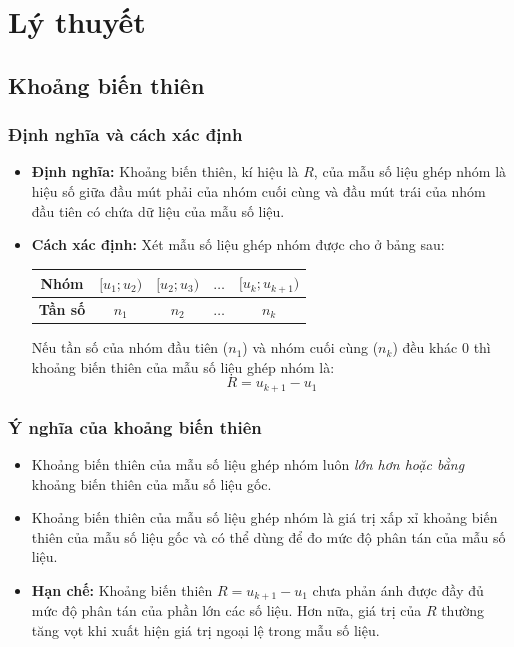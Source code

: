 \documentclass[12pt]{article}
\begin{document}
	\section{Lý thuyết}
	
	\subsection{Khoảng biến thiên}
	
	\subsubsection{Định nghĩa và cách xác định}
	\begin{itemize}
		\item \textbf{Định nghĩa:} Khoảng biến thiên, kí hiệu là $R$, của mẫu số liệu ghép nhóm là hiệu số giữa đầu mút phải của nhóm cuối cùng và đầu mút trái của nhóm đầu tiên có chứa dữ liệu của mẫu số liệu.
		\item \textbf{Cách xác định:} Xét mẫu số liệu ghép nhóm được cho ở bảng sau:
		
		\begin{center}
			\renewcommand{\arraystretch}{1.3}
			\begin{tabular}{|c|c|c|c|c|}
				\hline
				\textbf{Nhóm} & $[u_1; u_2)$ & $[u_2; u_3)$ & $\dots$ & $[u_k; u_{k+1})$ \\
				\hline
				\textbf{Tần số} & $n_1$ & $n_2$ & $\dots$ & $n_k$ \\
				\hline
			\end{tabular}
		\end{center}
		
		Nếu tần số của nhóm đầu tiên ($n_1$) và nhóm cuối cùng ($n_k$) đều khác 0 thì khoảng biến thiên của mẫu số liệu ghép nhóm là:
		\[ R = u_{k+1} - u_1 \]
	\end{itemize}
	
	\subsubsection{Ý nghĩa của khoảng biến thiên}
	\begin{itemize}
		\item Khoảng biến thiên của mẫu số liệu ghép nhóm luôn \textit{lớn hơn hoặc bằng} khoảng biến thiên của mẫu số liệu gốc.
		\item Khoảng biến thiên của mẫu số liệu ghép nhóm là giá trị xấp xỉ khoảng biến thiên của mẫu số liệu gốc và có thể dùng để đo mức độ phân tán của mẫu số liệu.
		\item \textbf{Hạn chế:} Khoảng biến thiên $R = u_{k+1} - u_1$ chưa phản ánh được đầy đủ mức độ phân tán của phần lớn các số liệu. Hơn nữa, giá trị của $R$ thường tăng vọt khi xuất hiện giá trị ngoại lệ trong mẫu số liệu.
	\end{itemize}
	
\end{document}
